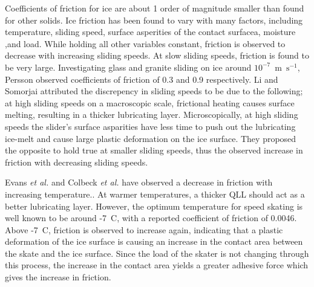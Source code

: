 Coefficients of friction for ice are about 1 order of magnitude
smaller than found for other solids. Ice friction has been found to
vary with many factors, including
temperature\cite{Roberts1981,Higgins2008,Bowden1939,Evans1976,Derjaguin1988,Liang2003},
sliding speed\cite{Evans1976,Derjaguin1988,Liang2003}, surface
asperities of the contact surfacea\cite{Bowden1939,Baurle2007},
moisture\cite{Calabrese1980} ,and
load.\cite{Buhl2001,Bowden1939,Derjaguin1988,Baurle2006,Oksanen1982}
While holding all other variables constant, friction is observed to
decrease with increasing sliding speeds. At slow sliding speeds,
friction is found to be very large. Investigating glass and granite
sliding on ice around $10^{-7}$~m~$\mathrm{s}^{-1}$, Persson observed
coefficients of friction of 0.3 and 0.9
respectively.\cite{Persson2001} Li and Somorjai attributed the
discrepency in sliding speeds to be due to the following; at high
sliding speeds on a macroscopic scale, frictional heating causes
surface melting, resulting in a thicker lubricating layer.
Microscopically, at high sliding speeds the slider's surface
asparities have less time to push out the lubricating ice-melt and
cause large plastic deformation on the ice surface.\cite{Li2007} They
proposed the opposite to hold true at smaller sliding speeds, thus the
observed increase in friction with decreasing sliding speeds.

Evans \textit{et al.} and Colbeck \textit{et al.} have observed a
decrease in friction with increasing
temperature.\cite{Evans1976,Colbeck1997}. At warmer temperatures, a
thicker QLL should act as a better lubricating layer. However, the
optimum temperature for speed skating is well known to be around
-7\degree~C, with a reported coefficient of friction of
0.0046.\cite{Dekoning1992} Above -7\degree~C, friction is observed to
increase again, indicating that a plastic deformation of the ice
surface is causing an increase in the contact area between the skate
and the ice surface.\cite{Barnes1966,Barnes1971} Since the load of the
skater is not changing through this process, the increase in the
contact area yields a greater adhesive force which gives the increase
in friction.

